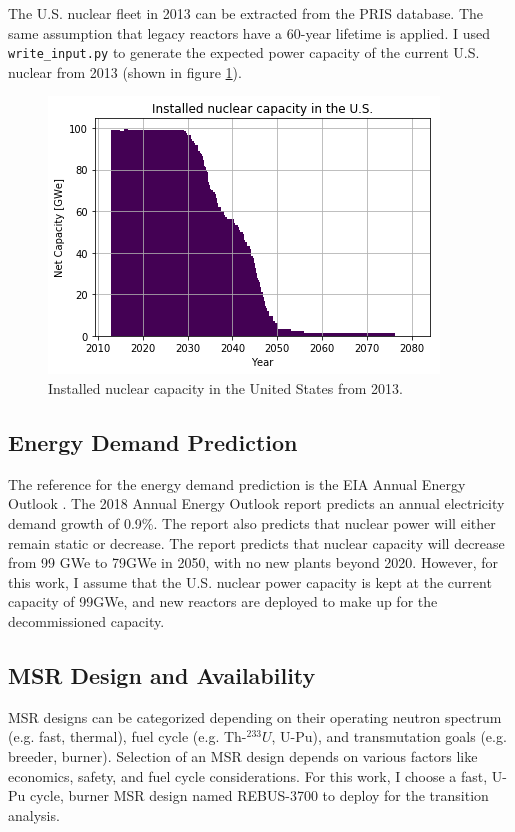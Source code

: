 The U.S. nuclear fleet in 2013 can be extracted from the \gls{PRIS} database.
The same assumption that legacy reactors have a 60-year lifetime is applied.
I used \texttt{write\_input.py} to generate the expected power capacity
of the current U.S. nuclear from 2013 (shown in figure \ref{fig:us_legacy}).

\begin{figure}[htbp!]
	\begin{center}
		\includegraphics[scale=0.6]{./images/us/legacy_power.png}
	\end{center}
	\caption{Installed nuclear capacity in the United States from 2013.}
	\label{fig:us_legacy}
\end{figure}


\subsection{Energy Demand Prediction}
The reference for the energy demand prediction is the 
\gls{EIA} Annual Energy Outlook \cite{u.s._eia_annual_2018}.
The 2018 Annual Energy Outlook report predicts an annual electricity demand growth
of 0.9\%. The report also predicts that nuclear
power will either remain static or decrease. The report
predicts that nuclear capacity will decrease from 99 GWe
to 79GWe in 2050, with no new plants beyond 2020.
However, for this work,
I assume that the U.S. nuclear power capacity is kept at the
current capacity of 99GWe, and new reactors are deployed to make up for the
decommissioned capacity.

\subsection{\gls{MSR} Design and Availability}

\gls{MSR} designs can be categorized depending on their operating
neutron spectrum (e.g. fast, thermal), fuel cycle (e.g. Th-$^{233}U$, U-Pu),
and transmutation goals (e.g. breeder, burner). Selection of an \gls{MSR}
design depends on various factors like economics, safety, and fuel cycle
considerations. For this work, I choose a fast, U-Pu cycle, burner \gls{MSR} design
named REBUS-3700 \cite{mourogov_potentialities_2006} to deploy for the
transition analysis.

